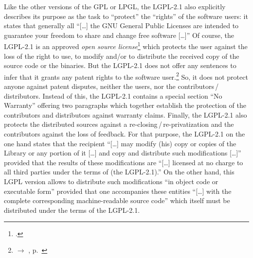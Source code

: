 Like the other versions of the GPL or LPGL, the LGPL-2.1 also explicitly
describes its purpose as the task to \enquote{protect} the \enquote{rights} of
the software users: it states that generally all \enquote{[\ldots] the GNU
General Public Licenses are intended to guarantee your freedom to share and
change free software [\ldots]} Of course, the LGPL-2.1 is
an approved \emph{open source license}\footcite[cf.][\nopage wp]{OSI2012b} which
protects the user against the loss of the right to use, to modify and/or to
distribute the received copy of the source code or the binaries. 
But the LGPL-2.1 does not offer any sentences to infer that it grants any patent
rights to the software user.\footnote{$\rightarrow$ \oslic,
p.\ } So, it does not protect anyone against
patent disputes, neither the users, nor the
contributors\,/\,distributors. Instead of this, the LGPL-2.1 contains a special 
section \enquote{No Warranty} offering two paragraphs which together establish
the protection of the contributors and distributors against warranty
claims. Finally, the LGPL-2.1 also protects the
distributed sources against a re-closing\,/\,re-privatization and the
contributors against the loss of feedback. For that purpose, the LGPL-2.1 on the
one hand states that the recipient \enquote{[\ldots] may modify (his) copy or
copies of the Library or any portion of it [\ldots] and copy and distribute such
modifications [\ldots]} provided that the results of these modifications are
\enquote{[\ldots] licensed at no charge to all third parties under the terms of
(the LGPL-2.1).} On the other hand, this LGPL version allows to
distribute such modifications \enquote{in object code or executable form}
provided that one accompanies these entities \enquote{[\ldots] with the complete
corresponding machine-readable source code} which itself must be distributed
under the terms of the LGPL-2.1.

